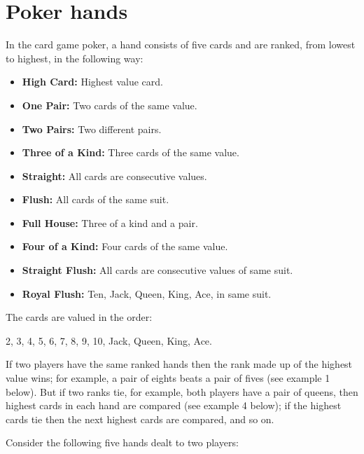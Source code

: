 \section{Poker hands} \label{pb.054}

In the card game poker, a hand consists of five cards and are ranked, from lowest to highest, in the following way:

\begin{itemize}
    \item \textbf{High Card:} Highest value card.
    \item \textbf{One Pair:} Two cards of the same value.
    \item \textbf{Two Pairs:} Two different pairs.
    \item \textbf{Three of a Kind:} Three cards of the same value.
    \item \textbf{Straight:} All cards are consecutive values.
    \item \textbf{Flush:} All cards of the same suit.
    \item \textbf{Full House:} Three of a kind and a pair.
    \item \textbf{Four of a Kind:} Four cards of the same value.
    \item \textbf{Straight Flush:} All cards are consecutive values of same suit.
    \item \textbf{Royal Flush:} Ten, Jack, Queen, King, Ace, in same suit.
\end{itemize}

The cards are valued in the order:

\begin{center}
    2, 3, 4, 5, 6, 7, 8, 9, 10, Jack, Queen, King, Ace.
\end{center}

If two players have the same ranked hands then the rank made up of the highest value wins; for example, a pair of eights beats a pair of fives (see example 1 below). But if two ranks tie, for example, both players have a pair of queens, then highest cards in each hand are compared (see example 4 below); if the highest cards tie then the next highest cards are compared, and so on.

Consider the following five hands dealt to two players:

